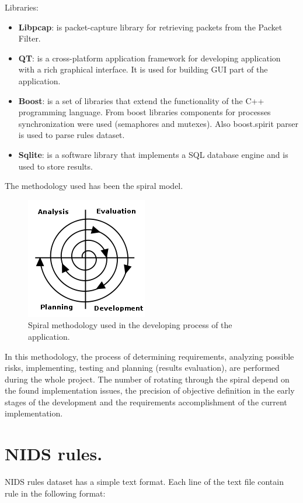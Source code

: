 \documentclass[thesis=M,english]{FITthesis}[2011/07/15]
\begin{document}
Libraries:

\begin{itemize}
\item \textbf{Libpcap}: is packet-capture library for retrieving packets from the Packet Filter.
\item \textbf{QT}: is a cross-platform application framework for developing application with a rich graphical interface. It is used for building GUI part of the application.
\item \textbf{Boost}: is a set of libraries that extend the functionality of the C++ programming language. From boost libraries components for processes synchronization were used (semaphores and mutexes). Also boost.spirit parser is used to parse rules dataset.
\item \textbf{Sqlite}: is a software library that implements a SQL database engine and is used to store results.
\end{itemize}

The methodology used has been the spiral model.
\begin{figure}[h]
\centering
\includegraphics[scale=0.7]{images/spiral-model.png}
\caption{Spiral methodology used in the developing process of the application.}
\end{figure}

In this methodology, the process of determining requirements, analyzing possible risks, implementing, testing and planning (results evaluation), are performed during the whole project. The number of rotating through the spiral depend on the found implementation issues, the precision of objective definition in the early stages of the development and the requirements accomplishment of the current implementation.

\section{NIDS rules.}
NIDS rules dataset has a simple text format. Each line of the text file contain rule in the following format:
\end{document}
